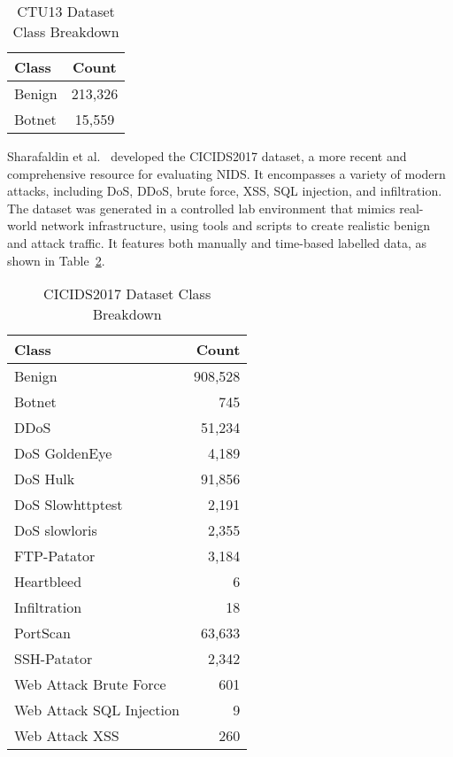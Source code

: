\begin{table}[ht]
    \centering
    \begin{tabular}{lc}
    \toprule
    \textbf{Class} & \textbf{Count} \\
    \midrule
    Benign & 213,326 \\
    Botnet & 15,559 \\
    \bottomrule
    \end{tabular}
    \caption{CTU13 Dataset Class Breakdown}\label{tab:ctu13_breakdown}
\end{table}

Sharafaldin et al.~\cite{sharafaldin2018toward} developed the CICIDS2017 dataset, a more recent and comprehensive resource for evaluating NIDS. It encompasses a variety of modern attacks, including DoS, DDoS, brute force, XSS, SQL injection, and infiltration. The dataset was generated in a controlled lab environment that mimics real-world network infrastructure, using tools and scripts to create realistic benign and attack traffic. It features both manually and time-based labelled data, as shown in Table~\ref{tab:cicids2017_breakdown}.

\begin{table}[ht]
    \centering
    \begin{tabular}{lr}
    \toprule
    \textbf{Class} & \textbf{Count} \\
    \midrule
    Benign & 908,528 \\
    Botnet & 745 \\
    DDoS & 51,234 \\
    DoS GoldenEye & 4,189 \\
    DoS Hulk & 91,856 \\
    DoS Slowhttptest & 2,191 \\
    DoS slowloris & 2,355 \\
    FTP-Patator & 3,184 \\
    Heartbleed & 6 \\
    Infiltration & 18 \\
    PortScan & 63,633 \\
    SSH-Patator & 2,342 \\
    Web Attack Brute Force & 601 \\
    Web Attack SQL Injection & 9 \\
    Web Attack XSS & 260 \\
    \bottomrule
    \end{tabular}
    \caption{CICIDS2017 Dataset Class Breakdown}\label{tab:cicids2017_breakdown}
\end{table}

